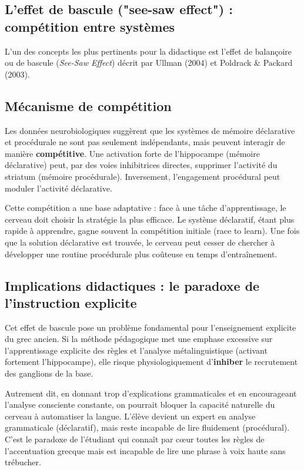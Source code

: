 \subsection{L'effet de bascule ("see-saw effect") : compétition entre systèmes}

L'un des concepts les plus pertinents pour la didactique est l'effet de \og balançoire\fg{} ou de
\og bascule\fg{} (\textit{See-Saw Effect}) décrit par Ullman (2004) et Poldrack \& Packard (2003).



\subsection{Mécanisme de compétition}

Les données neurobiologiques suggèrent que les systèmes de mémoire déclarative et procédurale ne
sont pas seulement indépendants, mais peuvent interagir de manière \textbf{compétitive}. Une
activation forte de l'hippocampe (mémoire déclarative) peut, par des voies inhibitrices directes,
supprimer l'activité du striatum (mémoire procédurale). Inversement, l'engagement procédural peut
moduler l'activité déclarative.

Cette compétition a une base adaptative : face à une tâche d'apprentissage, le cerveau doit \og
choisir\fg{} la stratégie la plus efficace. Le système déclaratif, étant plus rapide à apprendre,
gagne souvent la compétition initiale (\og race to learn\fg{}). Une fois que la solution déclarative
est trouvée, le cerveau peut cesser de chercher à développer une routine procédurale plus coûteuse
en temps d'entraînement.



\subsection{Implications didactiques : le paradoxe de l'instruction explicite}

Cet effet de bascule pose un problème fondamental pour l'enseignement explicite du grec ancien. Si
la méthode pédagogique met une emphase excessive sur l'apprentissage explicite des règles et
l'analyse métalinguistique (activant fortement l'hippocampe), elle risque physiologiquement
d'\textbf{inhiber} le recrutement des ganglions de la base.

Autrement dit, en donnant trop d'explications grammaticales et en encourageant l'analyse consciente
constante, on pourrait \og bloquer\fg{} la capacité naturelle du cerveau à automatiser la langue.
L'élève devient un expert en analyse grammaticale (déclaratif), mais reste incapable de lire
fluidement (procédural). C'est le paradoxe de l'étudiant qui connaît par cœur toutes les règles de
l'accentuation grecque mais est incapable de lire une phrase à voix haute sans trébucher.



